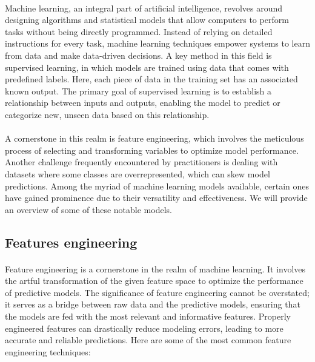     \paragraph{}Machine learning, an integral part of artificial intelligence, revolves around designing algorithms and statistical models that allow computers to perform tasks without being directly programmed. Instead of relying on detailed instructions for every task, machine learning techniques empower systems to learn from data and make data-driven decisions. A key method in this field is supervised learning, in which models are trained using data that comes with predefined labels. Here, each piece of data in the training set has an associated known output. The primary goal of supervised learning is to establish a relationship between inputs and outputs, enabling the model to predict or categorize new, unseen data based on this relationship.

    \paragraph{}A cornerstone in this realm is feature engineering, which involves the meticulous process of selecting and transforming variables to optimize model performance. Another challenge frequently encountered by practitioners is dealing with datasets where some classes are overrepresented, which can skew model predictions. Among the myriad of machine learning models available, certain ones have gained prominence due to their versatility and effectiveness. We will provide an overview of some of these notable models.

    \subsection{Features engineering}
        \paragraph{}Feature engineering\cite{khurana_feature_2017} is a cornerstone in the realm of machine learning. It involves the artful transformation of the given feature space to optimize the performance of predictive models. The significance of feature engineering cannot be overstated; it serves as a bridge between raw data and the predictive models, ensuring that the models are fed with the most relevant and informative features. Properly engineered features can drastically reduce modeling errors, leading to more accurate and reliable predictions. Here are some of the most common feature engineering techniques:

